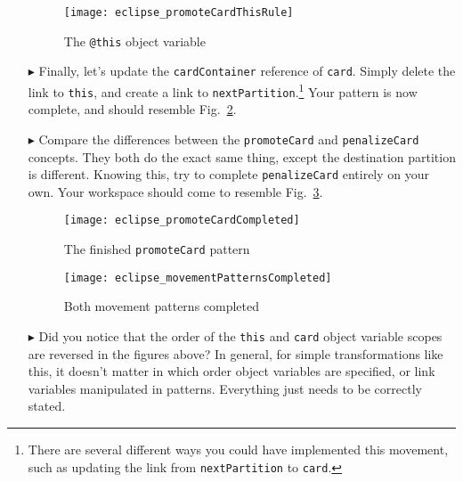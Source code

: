\begin{itemize}
\begin{figure}[htbp]
\begin{center}
  \texttt{[image: eclipse\_promoteCardThisRule]}
  \caption{The \texttt{@this} object variable}
  \label{fig:promoteThisRule}
\end{center}
\end{figure} 

\item[$\blacktriangleright$] Finally, let's update the \texttt{cardContainer} reference of \texttt{card}. Simply delete the link to \texttt{this}, and create
a link to \texttt{nextPartition}.\footnote{There are several different ways you could have implemented this movement, such as updating the link from
\texttt{nextPartition} to \texttt{card}.} Your pattern is now complete, and should resemble Fig.~\ref{fig:completedPromote}.

\vspace{0.5cm}

\item[$\blacktriangleright$] Compare the differences between the \texttt{promoteCard} and \texttt{penalizeCard} concepts. They both do the exact same thing,
except the destination partition is different. Knowing this, try to complete \texttt{penalizeCard} entirely on your own. Your workspace should come to
resemble Fig.~\ref{fig:completedPatterns}.

\newpage

\begin{figure}[htbp]
\begin{center}
  \texttt{[image: eclipse\_promoteCardCompleted]}
  \caption{The finished \texttt{promoteCard} pattern}
  \label{fig:completedPromote}
\end{center}
\end{figure} 

\begin{figure}[htbp]
\begin{center}
  \texttt{[image: eclipse\_movementPatternsCompleted]}
  \caption{Both movement patterns completed}
  \label{fig:completedPatterns}
\end{center}
\end{figure}

\item[$\blacktriangleright$] Did you notice that the order of the \texttt{this} and \texttt{card} object variable scopes are reversed in the figures above?
In general, for simple transformations like this, it doesn't matter in which order object variables are specified, or link variables manipulated in patterns.
Everything just needs to be correctly stated. 


\end{itemize}
